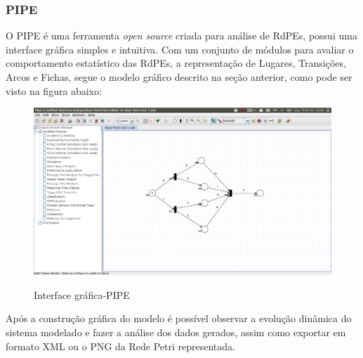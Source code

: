 		\subsubsection{PIPE}
			
			O PIPE\cite{bonet2007pipe} é uma ferramenta \textit{open source} criada para análise de RdPEs, possui uma interface gráfica simples e intuitiva. Com um conjunto de módulos para avaliar o comportamento estatístico das RdPEs, a representação de Lugares, Transições, Arcos e Fichas, segue o modelo gráfico descrito na seção anterior, como pode ser visto na figura abaixo:			
						
			\begin{figure}[h]
				\center
				\caption{Interface gráfica-PIPE}
				\includegraphics[width=1\textwidth]{img/pipe.jpg}
				\label{fig:PIPE}
			\end{figure}						
			
		Após a construção gráfica do modelo é possível observar a evolução dinâmica do sistema modelado e fazer a análise dos dados gerados, assim como exportar em formato XML ou o PNG da Rede Petri representada.